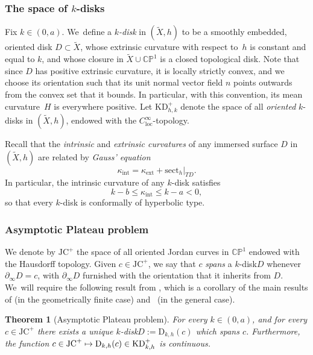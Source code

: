 \documentclass[JEP,XML,SOM,Unicode,NoEqCountersInSection,published]{cedram}
\newcommand\mto{\mathchoice{\longmapsto}{\mapsto}{\mapsto}{\mapsto}}
\newcommand{\kdisk}{$k$\nobreakdash-disk\xspace}
\newcommand{\kdisks}{$k$\nobreakdash-disks\xspace}
\newcommand{\intt}{\mathrm{int}}
\newcommand{\ext}{\mathrm{ext}}
\theoremstyle{plain}
\newtheorem{theorem}{Theorem}[section]
\theoremstyle{definition}
\newcommand\CP{\C\PP^1}
\newcommand{\C}{{\mathbb C}}
\newcommand{\PP}{{\mathbb P}}
\let\dans\subset
\newcommand{\loc}{\mathrm{loc}}
\newcommand{\sect}{\mathrm{sect}}
\newcommand{\KD}{\mathrm{KD}}
\newcommand{\JC}{\mathrm{JC}}
\newcommand{\rD}{\mathrm{D}}
\newcommand{\bord}{\partial_{\infty}}
\begin{document}
\subsubsection{The space of $k$-disks}\label{sss.space_k_discs}
Fix $k\in(0,a)$. We~define a \emph{\kdisk} in $(\tilde{X},h)$ to be a smoothly embedded, oriented disk $D\dans \tilde{X}$, whose extrinsic curvature with respect to~$h$ is constant and equal to $k$, and whose closure in $\tilde{X}\cup\CP$ is a closed topological disk. Note that since $D$ has positive extrinsic curvature, it is locally strictly convex, and we choose its orientation such that its unit normal vector field $n$ points outwards from the convex set that it bounds. In particular, with this convention, its mean curvature~$H$ is everywhere positive. Let $\KD^+_{h,k}$ denote the space of all \emph{oriented} \kdisks in $(\tilde{X},h)$, endowed with the $C^\infty_{\loc}$-topology.

Recall that the \emph{intrinsic} and \emph{extrinsic curvatures} of any immersed surface $D$ in $(\tilde{X},h)$ are related by \emph{Gauss' equation}
\begin{equation}
\kappa_{\intt}=\kappa_{\ext}+\sect_h|_{TD}.
\end{equation}
In particular, the intrinsic curvature of any \kdisk satisfies
\begin{equation}\label{eq_intr_curv}
k-b\leq\kappa_{\intt}\leq k-a<0,
\end{equation}
so that every \kdisk is conformally of hyperbolic type.

\subsubsection{Asymptotic Plateau problem}\label{sss.asymptotic_Plateau_problem} We denote by $\JC^+$ the space of all oriented Jordan curves in $\CP$ endowed with the Hausdorff topology. Given $c\in\JC^+$, we say that $c$ \emph{spans} a \kdisk $D$ whenever $\bord D=c$, with $\bord D$ furnished with the orientation that it inherits from $D$. We~will require the following result from \cite[Th.\,\&\,Def.\,2.1.1]{ALS}, which is a corollary of the main results of \cite{LabourieInvent} (in the geometrically finite case) and~\cite{Smith_asymp} (in the general case).

\begin{theorem}[Asymptotic Plateau problem]\label{th.As_plateau_problem}
For every $k\in(0,a)$, and for every $c\in\JC^+$ there exists a unique \kdisk $D:=\rD_{k,h}(c)$ which spans $c$. Furthermore, the function $c\in\JC^+\mto\rD_{k,h}(c)\in\KD^+_{k,h}$ is continuous.
\end{theorem}
\end{document}
